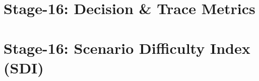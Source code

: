 ﻿%
\section{Stage-16: Decision \& Trace Metrics}


\section{Stage-16: Scenario Difficulty Index (SDI)}

